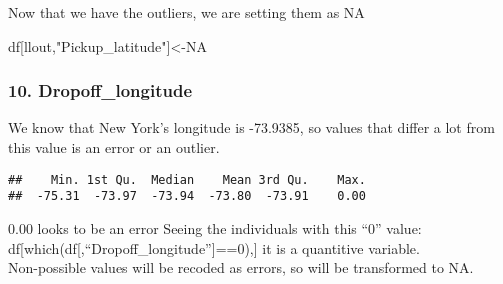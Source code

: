 \documentclass[
  18pt,
  a4paper]{article}
\newenvironment{Shaded}{\begin{snugshade}}{\end{snugshade}}
\newcommand{\CommentTok}[1]{\textcolor[rgb]{0.56,0.35,0.01}{\textit{#1}}}
\newcommand{\DecValTok}[1]{\textcolor[rgb]{0.00,0.00,0.81}{#1}}
\newcommand{\FloatTok}[1]{\textcolor[rgb]{0.00,0.00,0.81}{#1}}
\newcommand{\KeywordTok}[1]{\textcolor[rgb]{0.13,0.29,0.53}{\textbf{#1}}}
\newcommand{\NormalTok}[1]{#1}
\newcommand{\OperatorTok}[1]{\textcolor[rgb]{0.81,0.36,0.00}{\textbf{#1}}}
\newcommand{\OtherTok}[1]{\textcolor[rgb]{0.56,0.35,0.01}{#1}}
\newcommand{\StringTok}[1]{\textcolor[rgb]{0.31,0.60,0.02}{#1}}
\begin{document}
\begin{Shaded}
\end{Shaded}

Now that we have the outliers, we are setting them as NA

\begin{Shaded}
\begin{Highlighting}[]
\NormalTok{df[llout,}\StringTok{"Pickup_latitude"}\NormalTok{]<-}\OtherTok{NA}
\end{Highlighting}
\end{Shaded}

\hypertarget{dropoff_longitude}{%
\subsubsection{10. Dropoff\_longitude}\label{dropoff_longitude}}

We know that New York's longitude is -73.9385, so values that differ a
lot from this value is an error or an outlier.

\begin{Shaded}
\end{Shaded}

\begin{verbatim}
##    Min. 1st Qu.  Median    Mean 3rd Qu.    Max. 
##  -75.31  -73.97  -73.94  -73.80  -73.91    0.00
\end{verbatim}

0.00 looks to be an error Seeing the individuals with this ``0'' value:
df{[}which(df{[},``Dropoff\_longitude''{]}==0),{]} it is a quantitive
variable.\\
Non-possible values will be recoded as errors, so will be transformed to
NA.

\begin{Shaded}
\end{Shaded}
\end{document}
